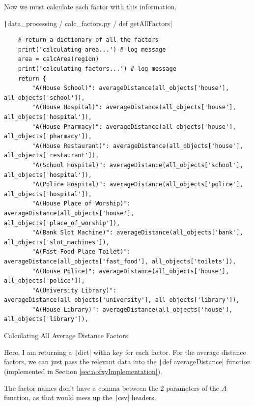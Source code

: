 \documentclass[12pt]{report}
\newcommand{\pil}[1]{\protect\texttt|#1|}
\begin{document}
Now we must calculate each factor with this information.

\begin{listing}[H]
\pil{data_processing / calc_factors.py / def getAllFactors}
\begin{verbatim}
    # return a dictionary of all the factors
    print('calculating area...') # log message
    area = calcArea(region)
    print('calculating factors...') # log message
    return {
        "A(House School)": averageDistance(all_objects['house'], all_objects['school']),
        "A(House Hospital)": averageDistance(all_objects['house'], all_objects['hospital']),
        "A(House Pharmacy)": averageDistance(all_objects['house'], all_objects['pharmacy']),
        "A(House Restaurant)": averageDistance(all_objects['house'], all_objects['restaurant']),
        "A(School Hospital)": averageDistance(all_objects['school'], all_objects['hospital']),
        "A(Police Hospital)": averageDistance(all_objects['police'], all_objects['hospital']),
        "A(House Place of Worship)": averageDistance(all_objects['house'], all_objects['place_of_worship']),
        "A(Bank Slot Machine)": averageDistance(all_objects['bank'], all_objects['slot_machines']),
        "A(Fast-Food Place Toilet)": averageDistance(all_objects['fast_food'], all_objects['toilets']),
        "A(House Police)": averageDistance(all_objects['house'], all_objects['police']),
        "A(University Library)": averageDistance(all_objects['university'], all_objects['library']),
        "A(House Library)": averageDistance(all_objects['house'], all_objects['library']),
\end{verbatim}
\caption{Calculating All Average Distance Factors}\label{cs:calcAllAFactors}
\end{listing}

Here, I am returning a \pil{dict} witha key for each factor. For the average distance factors, we can just pass the relevant data into the \pil{def averageDistance} function (implemented in Section \ref{sec:aofxyImplementation}).

The factor names don't have a comma between the 2 parameters of the $A$ function, as that would mess up the \pil{csv} headers.
\end{document}

